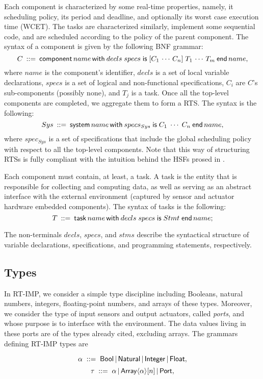 \documentclass{llncs}
\begin{document}
Each component is characterized by some real-time properties, namely, it scheduling policy, its period and deadline, and optionally its worst case execution time (WCET). The tasks are characterized similarly, implement some sequential code, and are scheduled according to the policy of the parent component. The syntax of a component is given by the following BNF grammar:
$$
C\:::=\:{\sf component}\,name\,{\sf with}\:decls\;specs\;{\sf is}\;[C_1\,\cdots\,C_n]\;T_1\,\cdots\,T_m\:{\sf end}\,name,
$$
where $name$ is the component's identifier, $decls$ is a set of local variable declarations, $specs$ is a set of logical and non-functional specifications, $C_i$ are $C$'s sub-components (possibly none), and $T_j$ is a task. Once all the top-level components are completed, we aggregate them to form a RTS. The syntax is the following:
$$
Sys\:::=\:{\sf system}\,name\,{\sf with}\:specs_{Sys}\;{\sf is}\;C_1\;\cdots\;C_n\:{\sf end}\,name,
$$
where $spec_{Sys}$ is a set of specifications that include the global scheduling policy with respect to all the top-level components. Note that this way of structuring RTSs is fully compliant with the intuition behind the HSFs prosed in \cite{}.

Each component must contain, at least, a task. A task is the entity that is responsible for collecting and computing data, as well as serving as an abstract interface with the external environment (captured by sensor and actuator hardware embedded components). The syntax of tasks is the following:
$$
T\:::=\:{\sf task}\,name\,{\sf with}\:decls\;specs\;{\sf is}\;Stmt\;{\sf end}\,name;
$$

The non-terminals $decls$, $specs$, and $stms$ describe the syntactical structure of variable declarations, specifications, and programming statements, respectively. 

\subsection{Types}

In RT-IMP, we consider a simple type discipline including Booleans, natural numbers, integers, floating-point numbers, and arrays of these types. Moreover, we consider the type of input sensors and output actuators, called {\em ports}, and whose purpose is to interface with the environment. The data values living in these ports are of the types already cited, excluding arrays. The grammars defining RT-IMP types are

$$\alpha\;::=\;{\sf Bool}\,|\,{\sf Natural}\,|\,{\sf Integer}\,|\,{\sf Float},$$
$$\tau\;::=\;\alpha\,|\,{\sf Array}\langle\alpha\rangle[n]\,|\,{\sf Port},$$
\end{document}

